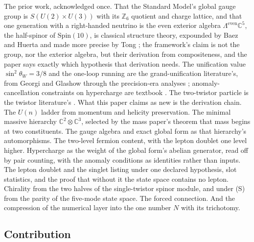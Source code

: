\documentclass[11pt]{article}
\theoremstyle{definition}
\newcommand{\C}{\mathbb{C}}
\begin{document}
The prior work, acknowledged once. That the Standard Model's global gauge group is $S(U(2) \times U(3))$ with its $\mathbb{Z}_{6}$ quotient and charge lattice, and that one generation with a right-handed neutrino is the even exterior algebra $\Lambda^{\mathrm{even}}\C^{5}$, the half-spinor of $\mathrm{Spin}(10)$, is classical structure theory, expounded by Baez and Huerta \cite{BaezHuerta2010} and made more precise by Tong \cite{Tong2017}; the framework's claim is not the group, nor the exterior algebra, but their derivation from compositeness, and the paper says exactly which hypothesis that derivation needs. The unification value $\sin^{2}\theta_{W} = 3/8$ and the one-loop running are the grand-unification literature's, from Georgi and Glashow \cite{GeorgiGlashow1974} through the precision-era analyses \cite{Amaldi1991}; anomaly-cancellation constraints on hypercharge are textbook \cite{WeinbergQFT2}. The two-twistor particle is the twistor literature's \cite{PenroseRindler1986}. What this paper claims as new is the derivation chain. The $U(n)$ ladder from momentum and helicity preservation. The minimal massive hierarchy $\C^{2}\otimes\C^{3}$, selected by the mass paper's theorem that mass begins at two constituents. The gauge algebra and exact global form as that hierarchy's automorphisms. The two-level fermion content, with the lepton doublet one level higher. Hypercharge as the weight of the global form's abelian generator, read off by pair counting, with the anomaly conditions as identities rather than inputs. The lepton doublet and the singlet listing under one declared hypothesis, slot statistics, and the proof that without it the state space contains no lepton. Chirality from the two halves of the single-twistor spinor module, and under (S) from the parity of the five-mode state space. The forced connection. And the compression of the numerical layer into the one number $N$ with its trichotomy.

\subsection*{Contribution}
\end{document}
